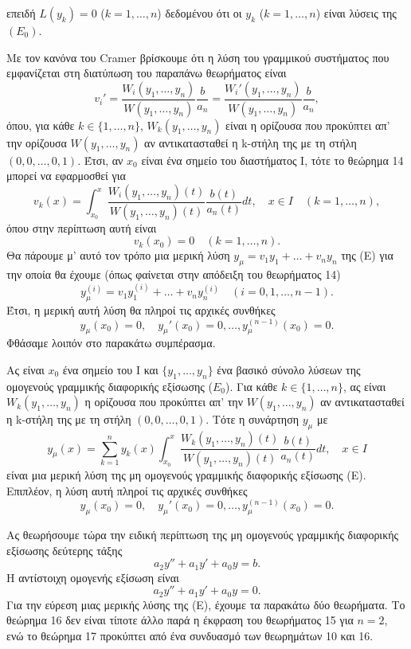 \documentclass[11pt,a4paper,twoside]{book}
\newcommand{\titlefont}[1]{{\fontfamily{maksf}\selectfont #1}}
\newcounter{thewrhma}[chapter]
\renewcommand{\thethewrhma}{\thechapter.\arabic{thewrhma}}
\newcommand{\thewr}{\refstepcounter{thewrhma}{\bf\titlefont{\textcolor{secondarycolor}{\large Θεώρημα\hspace{2mm}\thethewrhma}}}\hspace{1mm}}{}
\newenvironment{Thewrhma}[1]
{\begin{tcolorbox}[title=\thewr\ \ :\ \  {\textcolor{black}{\bf{\large\titlefont{#1}}}},
breakable,
enhanced standard,
titlerule=-.2pt,
toprule=0pt, 
rightrule=0pt, 
bottomrule=0pt,
colback=white,
left=2mm,
top=1mm,
bottom=0mm,
boxrule=0pt,
colframe=white,
borderline west={1.5mm}{0pt}{secondarycolor},
leftrule=2mm,
sharp corners,
coltitle=secondarycolor]}
{\end{tcolorbox}}
\begin{document}
επειδή $L(y_k)=0$ ($k=1,\dots,n$) δεδομένου ότι οι $y_k$ ($k=1,\dots,n$) είναι λύσεις της $(E_0)$.

Με τον κανόνα του Cramer βρίσκουμε ότι η λύση του γραμμικού συστήματος που εμφανίζεται στη διατύπωση του παραπάνω θεωρήματος είναι
\[
    v_i' = \frac{W_i(y_1,\dots,y_n)}{W(y_1,\dots,y_n)} \frac{b}{a_n} = \frac{W_i'(y_1,\dots,y_n)}{W(y_1,\dots,y_n)} \frac{b}{a_n},
\]
όπου, για κάθε $k\in\{1,\dots,n\}$, $W_k(y_1,\dots,y_n)$ είναι η ορίζουσα που προκύπτει απ' την ορίζουσα $W(y_1,\dots,y_n)$ αν αντικατασταθεί η k-στήλη της με τη στήλη $(0,0,\dots,0,1)$. Έτσι, αν $x_0$ είναι ένα σημείο του διαστήματος Ι, τότε το θεώρημα 14 μπορεί να εφαρμοσθεί για
\[
    v_k(x) = \int_{x_0}^x \frac{W_i(y_1,\dots,y_n)(t)}{W(y_1,\dots,y_n)(t)} \frac{b(t)}{a_n(t)} dt, \quad x\in I \quad (k=1,\dots,n),
\]
όπου στην περίπτωση αυτή είναι
\[
    v_k(x_0)=0 \quad (k=1,\dots,n).
\]
Θα πάρουμε μ' αυτό τον τρόπο μια μερική λύση $y_\mu=v_1 y_1 + \dots + v_n y_n$ της (Ε) για την οποία θα έχουμε (όπως φαίνεται στην απόδειξη του θεωρήματος 14)
\[
    y_\mu^{(i)} = v_1 y_1^{(i)} + \dots + v_n y_n^{(i)} \quad (i=0,1,\dots,n-1).
\]
Έτσι, η μερική αυτή λύση θα πληροί τις αρχικές συνθήκες
\[
    y_\mu(x_0)=0, \quad y_\mu'(x_0)=0, \dots, y_\mu^{(n-1)}(x_0)=0.
\]
Φθάσαμε λοιπόν στο παρακάτω συμπέρασμα.

\begin{Thewrhma}{15}
Ας είναι $x_0$ ένα σημείο του Ι και $\{y_1,\dots,y_n\}$ ένα βασικό σύνολο λύσεων της ομογενούς γραμμικής διαφορικής εξίσωσης ($E_0$). Για κάθε $k\in\{1,\dots,n\}$, ας είναι $W_k(y_1,\dots,y_n)$ η ορίζουσα που προκύπτει απ' την $W(y_1,\dots,y_n)$ αν αντικατασταθεί η k-στήλη της με τη στήλη $(0,0,\dots,0,1)$. Τότε η συνάρτηση $y_\mu$ με
\[
    y_\mu(x) = \sum_{k=1}^n y_k(x) \int_{x_0}^x \frac{W_k(y_1,\dots,y_n)(t)}{W(y_1,\dots,y_n)(t)} \frac{b(t)}{a_n(t)} dt, \quad x\in I
\]
είναι μια μερική λύση της μη ομογενούς γραμμικής διαφορικής εξίσωσης (Ε). Επιπλέον, η λύση αυτή πληροί τις αρχικές συνθήκες
\[
    y_\mu(x_0)=0, \quad y_\mu'(x_0)=0, \dots, y_\mu^{(n-1)}(x_0)=0.
\]
\end{Thewrhma}
Ας θεωρήσουμε τώρα την ειδική περίπτωση της μη ομογενούς γραμμικής διαφορικής εξίσωσης δεύτερης τάξης
\begin{equation}
    a_2 y'' + a_1 y' + a_0 y = b.
\end{equation}
Η αντίστοιχη ομογενής εξίσωση είναι
\begin{equation}
    a_2 y'' + a_1 y' + a_0 y = 0.
\end{equation}
Για την εύρεση μιας μερικής λύσης της (Ε), έχουμε τα παρακάτω δύο θεωρήματα. Το θεώρημα 16 δεν είναι τίποτε άλλο παρά η έκφραση του θεωρήματος 15 για $n=2$, ενώ το θεώρημα 17 προκύπτει από ένα συνδυασμό των θεωρημάτων 10 και 16.
\end{document}
